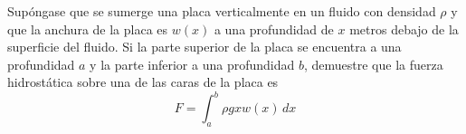 \item Supóngase que se sumerge una placa verticalmente en un fluido con densidad $\rho$ y que la anchura de la placa es $w(x)$ a una profundidad de $x$ metros debajo de la superficie del fluido. Si la parte superior de la placa se encuentra a una profundidad $a$ y la parte inferior a una profundidad $b$, demuestre que la fuerza hidrostática sobre una de las caras de la placa es
    \[ F = \int_a^b \rho g x w(x) \, dx \]
